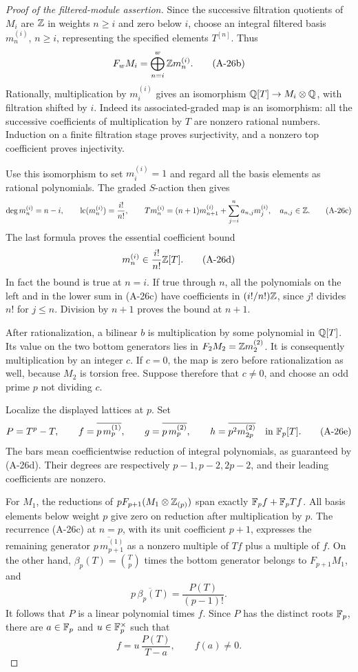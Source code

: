 \begin{proof}[Proof of the filtered-module assertion]
Since the successive filtration quotients of \(M_i\) are
\(\mathbb Z\) in weights \(n\ge i\) and zero below \(i\), choose an
integral filtered basis \(m_n^{(i)}\), \(n\ge i\), representing
the specified elements \(T^{[n]}\). Thus
\[
 F_wM_i=\bigoplus_{n=i}^{w}\mathbb Z m_n^{(i)}.
 \tag{A-26b}
\]
Rationally, multiplication by \(m_i^{(i)}\) gives an isomorphism
\(\mathbb Q[T]\to M_i\otimes\mathbb Q\), with filtration shifted by \(i\).
Indeed its associated-graded map is an isomorphism: all the
successive coefficients of multiplication by \(T\) are
nonzero rational numbers. Induction on a finite filtration
stage proves surjectivity, and a nonzero top coefficient
proves injectivity.

Use this isomorphism to set \(m_i^{(i)}=1\) and regard all the
basis elements as rational polynomials. The graded \(S\)-action
then gives
\[
 \deg m_n^{(i)}=n-i,\qquad
 \operatorname{lc}(m_n^{(i)})=\frac{i!}{n!},
 \qquad
 Tm_n^{(i)}=(n+1)m_{n+1}^{(i)}
                 +\sum_{j=i}^{n}a_{n,j}m_j^{(i)},
 \quad a_{n,j}\in\mathbb Z.
 \tag{A-26c}
\]
The last formula proves the essential coefficient bound
\[
             m_n^{(i)}\in\frac{i!}{n!}\mathbb Z[T].
 \tag{A-26d}
\]
In fact the bound is true at \(n=i\). If true through \(n\),
all the polynomials on the left and in the lower sum in
(A-26c) have coefficients in \((i!/n!)\mathbb Z\), since
\(j!\) divides \(n!\) for \(j\le n\). Division by \(n+1\)
proves the bound at \(n+1\).

After rationalization, a bilinear \(b\) is multiplication by
some polynomial in \(\mathbb Q[T]\). Its value on the two bottom
generators lies in \(F_2M_2=\mathbb Z m_2^{(2)}\). It is consequently
multiplication by an integer \(c\). If \(c=0\), the map is zero
before rationalization as well, because \(M_2\) is torsion free.
Suppose therefore that \(c\ne0\), and choose an odd prime
\(p\) not dividing \(c\).

Localize the displayed lattices at \(p\). Set
\[
 P=T^p-T,\qquad
 f=\overline{p\,m_p^{(1)}},\qquad
 g=\overline{p\,m_p^{(2)}},\qquad
 h=\overline{p^2m_{2p}^{(2)}}\quad\text{in }\mathbb F_p[T].
 \tag{A-26e}
\]
The bars mean coefficientwise reduction of integral polynomials,
as guaranteed by (A-26d). Their degrees are respectively
\(p-1,p-2,2p-2\), and their leading coefficients are nonzero.

For \(M_1\), the reductions of
\(pF_{p+1}(M_1\otimes\mathbb Z_{(p)})\) span exactly
\(\mathbb F_pf+\mathbb F_pTf\). All basis elements below weight \(p\)
give zero on reduction after multiplication by \(p\).
The recurrence (A-26c) at \(n=p\), with its unit coefficient
\(p+1\), expresses the remaining generator
\(\overline{p\,m_{p+1}^{(1)}}\) as a nonzero multiple of
\(Tf\) plus a multiple of \(f\).
On the other hand,
\(\beta_p(T)=\binom Tp\) times the bottom generator belongs
to \(F_{p+1}M_1\), and
\[
 \overline{p\,\beta_p(T)}=\frac{P(T)}{(p-1)!}.
\]
It follows that \(P\) is a linear polynomial times \(f\).
Since \(P\) has the distinct roots \(\mathbb F_p\), there are
\(a\in\mathbb F_p\) and \(u\in\mathbb F_p^\times\) such that
\[
                 f=u\,\frac{P(T)}{T-a},
                 \qquad f(a)\ne0.
 \tag{A-26f}
\]


\end{proof}
